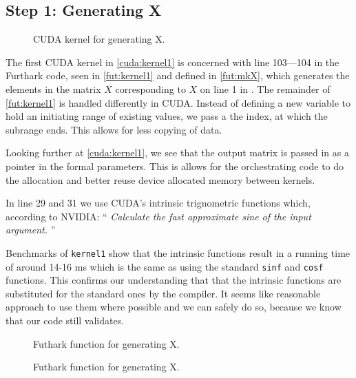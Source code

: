 \subsection{
    Step 1: Generating X
}

\begin{figure}[H]
    \centering
    \caption{CUDA kernel for generating X.}
    \label{cuda:kernel1}
\end{figure}



The first CUDA kernel in \autoref{cuda:kernel1} is concerned with line 103---104
in the Furthark code, seen in \autoref{fut:kernel1} and defined in \autoref{fut:mkX},
which generates the elements in the matrix \(X\) corresponding to \(X\) on line
1 in \cite[Algorithm 1, \textsc{BFAST}, p. 3]{bfast}.
The remainder of \autoref{fut:kernel1} is handled differently in CUDA. Instead of
defining a new variable to hold an initiating range of existing values, we pass a
the index, at which the subrange ends. This allows for less copying of data.

Looking further at \autoref{cuda:kernel1}, we see that the output matrix is
passed in as a pointer in the formal parameters. This is allows for the
orchestrating code to do the allocation and better reuse device allocated memory
between kernels.

In line 29 and 31 we use CUDA's intrinsic trignometric functions which,
according to NVIDIA:
\enquote{
    \textit{
Calculate the fast approximate sine of the input argument.
}
}

Benchmarks of \texttt{kernel1} show that the intrinsic functions result in a
running time of around 14-16 ms which is the same as using the standard
\texttt{sinf} and \texttt{cosf} functions. This confirms our understanding that
that the intrinsic functions are substituted for the standard ones by the
compiler.  It seems like reasonable approach to use them where possible and we
can safely do so, because we know that our code still validates.

\begin{figure}[H]
    \centering
    \caption{Futhark function for generating X.}
    \label{fut:kernel1}
\end{figure}


\begin{figure}[H]
    \centering
    \caption{Futhark function for generating X.}
    \label{fut:mkX}
\end{figure}



